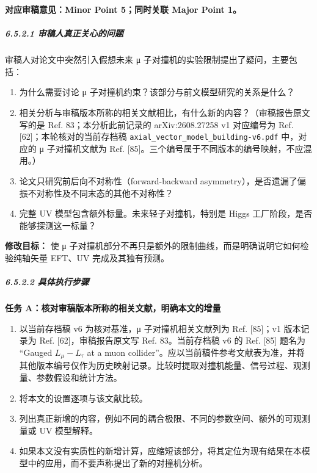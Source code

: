 \documentclass[
]{article}
\providecommand{\tightlist}{%
  \setlength{\itemsep}{0pt}\setlength{\parskip}{0pt}}
\begin{document}
\textbf{对应审稿意见：Minor Point 5；同时关联 Major Point 1。}

\subparagraph{6.5.2.1
审稿人真正关心的问题}\label{ux5ba1ux7a3fux4ebaux771fux6b63ux5173ux5fc3ux7684ux95eeux9898-3}

审稿人对论文中突然引入假想未来 μ
子对撞机的实验限制提出了疑问，主要包括：

\begin{enumerate}
\def\labelenumi{\arabic{enumi}.}
\tightlist
\item
  为什么需要讨论 μ 子对撞机约束？该部分与前文模型研究的关系是什么？
\item
  相关分析与审稿版本所称的相关文献相比，有什么新的内容？（审稿报告原文写的是
  Ref. 83；本分析此前记录的 arXiv:2608.27258 v1 对应编号为 Ref.
  {[}62{]}；本轮核对的当前存档稿
  \texttt{axial\_vector\_model\_building-v6.pdf} 中，对应的 μ
  子对撞机文献为 Ref.
  {[}85{]}。三个编号属于不同版本的编号映射，不应混用。）
\item
  论文只研究前后向不对称性（forward-backward
  asymmetry），是否遗漏了偏振不对称性及不同末态的其他不对称性？
\item
  完整 UV 模型包含额外标量。未来轻子对撞机，特别是 Higgs
  工厂阶段，是否能够探测这一标量？
\end{enumerate}

\textbf{修改目标：} 使 μ
子对撞机部分不再只是额外的限制曲线，而是明确说明它如何检验纯轴矢量
EFT、UV 完成及其独有预测。

\subparagraph{6.5.2.2
具体执行步骤}\label{ux5177ux4f53ux6267ux884cux6b65ux9aa4-3}

\textbf{任务 A：核对审稿版本所称的相关文献，明确本文的增量}

\begin{enumerate}
\def\labelenumi{\arabic{enumi}.}
\tightlist
\item
  以当前存档稿 v6 为核对基准，μ 子对撞机相关文献列为 Ref. {[}85{]}；v1
  版本记录为 Ref. {[}62{]}，审稿报告原文写 Ref. 83。当前存档稿 v6 的
  Ref. {[}85{]} 题名为 ``Gauged \(L_\mu-L_\tau\) at a muon
  collider''。应以当前稿件参考文献表为准，并将其他版本编号仅作为历史映射记录。比较时提取对撞机能量、信号过程、观测量、参数假设和统计方法。
\item
  将本文的设置逐项与该文献比较。
\item
  列出真正新增的内容，例如不同的耦合极限、不同的参数空间、额外的可观测量或
  UV 模型解释。
\item
  如果本文没有实质性的新增计算，应缩短该部分，将其定位为现有结果在本模型中的应用，而不要声称提出了新的对撞机分析。
\end{enumerate}
\end{document}
